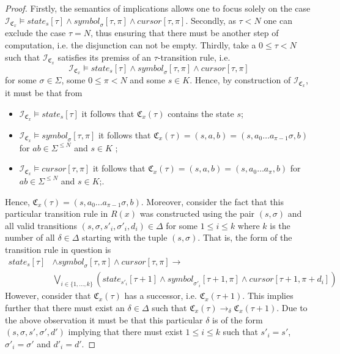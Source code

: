 \documentclass [11pt]{article}
\newcommand{\sym}[3]{\textit{symbol}_{#1}[#2,#3]}
\newcommand{\cursor}[2]{\textit{cursor}[#1,#2]}
\newcommand{\state}[2]{\textit{state}_{#1}[#2]}
\newcommand{\sequ}[1]{\mathfrak{C}_{#1}}
\newcommand{\sequint}[2]{ \mathcal{#1}_{\mathfrak{C}_{#2}}}
\begin{document}
\begin{proof}
Firstly, the semantics of implications allows one to focus solely on the case $\sequint{I}{x} \models \state{s}{\tau} \wedge \sym{\sigma}{\tau}{\pi} \wedge \cursor{\tau}{\pi}$.
Secondly, as $\tau < N$ one can exclude the case $\tau=N$, thus ensuring that there must be another step of computation, i.e. the disjunction can not be empty.
Thirdly, take a $0 \leq \tau < N$ such that $\sequint{I}{x}$ satisfies its premiss of an $\tau$-transition rule, i.e. 
\begin{equation*}
\sequint{I}{x} \models \state{s}{\tau} \land \sym{\sigma}{\tau}{\pi} \land \cursor{\tau}{\pi}
\end{equation*}
for some $\sigma \in \Sigma$, some $0 \leq \pi <N$ and some $s \in K$.
Hence, by construction of $\sequint{I}{x} $, it must be that from
\begin{itemize}
\item $\sequint{I}{x} \models  \state{s}{\tau}$ it follows that $\sequ{x}(\tau)$ contains the state $s$;
\item  $\sequint{I}{x} \models \sym{\sigma}{\tau}{\pi}$ it follows that  $\sequ{x}(\tau)= (s,a,b)=(s,a_0\dots a_{\pi-1}\sigma, b)$ for $ab \in \Sigma^{\leq N}$ and $s \in K$ ;
\item  $\sequint{I}{x} \models \cursor{\tau}{\pi}$ it follows that $\sequ{x}(\tau)= (s,a,b)= (s,a_0\dots a_{\pi}, b)$ for $ab \in \Sigma^{\leq N}$ and $s \in K$;.
\end{itemize}
Hence, $\sequ{x}(\tau)=(s,a_0\dots a_{\pi-1}\sigma, b)$.
Moreover, consider the fact that this particular transition rule in $R(x)$ was constructed using the pair $(s,\sigma)$ and all valid transitions $(s,\sigma , s'_i,\sigma'_i, d_i) \in \Delta$ for some $1\leq i\leq k$ where $k$ is the number of all $\delta \in \Delta$ starting with the tuple $(s,\sigma)$.
That is, the form of the transition rule in question is 
\begin{equation*}
\begin{split}
\state{s}{\tau}& \wedge \sym{\sigma}{\tau}{\pi} \wedge \cursor{\tau}{\pi} \to  \\
&\bigvee_{i \in \{1,\dots ,k\}} ({\state{s'_i}{\tau+1}} \wedge \sym{\sigma'_i}{\tau+1}{\pi} \wedge {\cursor{\tau+1}{\pi+d_i}} ) 
\end{split}
\end{equation*}
However, consider that $\sequ{x}(\tau)$ has a successor, i.e. $\sequ{x}(\tau+1)$. This implies further that there must exist an $\delta \in \Delta$ such that $\sequ{x}(\tau) \to_{\delta} \sequ{x}(\tau+1)$.
Due to the above observation it must be that this particular $\delta$ is of the form $(s,\sigma, s', \sigma',d')$ implying that there must exist $1\leq i\leq k$ such that $s'_i=s'$, $\sigma'_i=\sigma'$ and $d'_i=d'$.

\end{proof}
\end{document}
